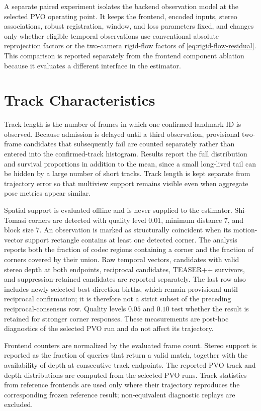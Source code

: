 A separate paired experiment isolates the backend observation model at the
selected PVO operating point. It keeps the frontend, encoded inputs, stereo
associations, robust registration, window, and loss parameters fixed, and
changes only whether eligible temporal observations use conventional absolute
reprojection factors or the two-camera rigid-flow factors of
\autoref{eq:rigid-flow-residual}. This comparison is reported separately from
the frontend component ablation because it evaluates a different interface in
the estimator.

\section{Track Characteristics}

Track length is the number of frames in which one confirmed landmark ID is observed. Because admission is delayed until a third observation, provisional two-frame candidates that subsequently fail are counted separately rather than entered into the confirmed-track histogram. Results report the full distribution and survival proportions in addition to the mean, since a small long-lived tail can be hidden by a large number of short tracks. Track length is kept separate from trajectory error so that multiview support remains visible even when aggregate pose metrics appear similar.

Spatial support is evaluated offline and is never supplied to the estimator.
Shi-Tomasi corners are detected with quality level $0.01$, minimum distance 7,
and block size 7. An observation is marked as structurally coincident when its
motion-vector support rectangle contains at least one detected corner. The
analysis reports both the fraction of codec regions containing a corner and the
fraction of corners covered by their union. Raw temporal vectors, candidates
with valid stereo depth at both endpoints, reciprocal candidates, TEASER++
survivors, and suppression-retained candidates are reported separately. The
last row also includes newly selected best-direction births, which remain
provisional until reciprocal confirmation; it is therefore not a strict subset
of the preceding reciprocal-consensus row.
Quality levels $0.05$ and $0.10$ test whether the result is retained for
stronger corner responses. These measurements are post-hoc diagnostics of the
selected PVO run and do not affect its trajectory.

Frontend counters are normalized by the evaluated frame count. Stereo support is
reported as the fraction of queries that return a valid match, together with the
availability of depth at consecutive track endpoints. The reported PVO track and
depth distributions are computed from the selected PVO runs. Track statistics from reference
frontends are used only where their trajectory reproduces the corresponding
frozen reference result; non-equivalent diagnostic replays are excluded.


